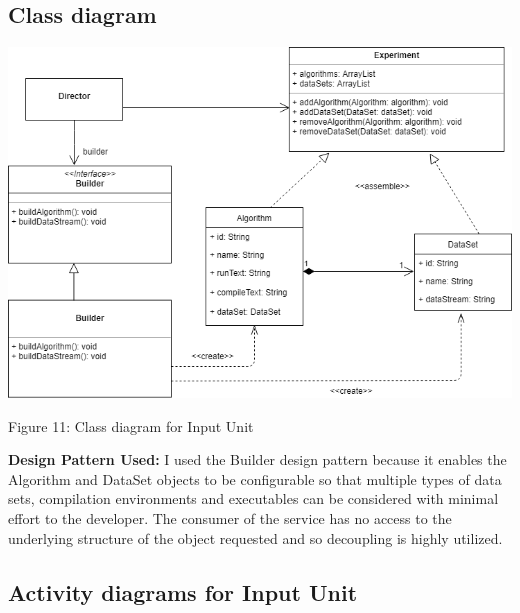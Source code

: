 \subsection{Class diagram}
	\includegraphics[width=\textwidth]{input_unit/images/input_unit_class_diagram.png}
	\begin{center}
	    \small{Figure 11: Class diagram for Input Unit}
    \end{center}
 \begin{flushleft}
\par\textbf{Design Pattern Used: }
	I used the Builder design pattern because it enables the Algorithm and DataSet objects to be configurable so that multiple types of data sets, compilation environments and executables can be considered with minimal effort to the developer. The consumer of the service has no access to the underlying structure of the object requested and so decoupling is highly utilized.
    \end{flushleft}
	
\subsection{Activity diagrams for Input Unit}
